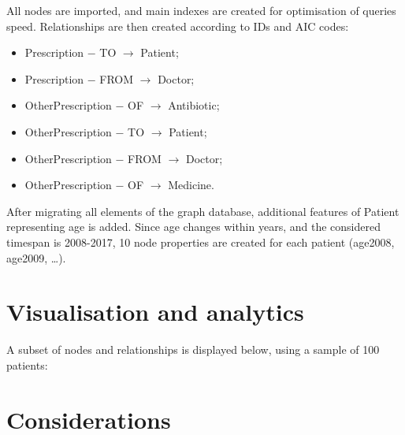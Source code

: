All nodes are imported, and main indexes are created for optimisation of queries speed. Relationships are then created according to IDs and AIC codes:
\begin{itemize}
	\item Prescription $-$ TO $\rightarrow$ Patient;
	\item Prescription $-$ FROM $\rightarrow$ Doctor;
	\item OtherPrescription $-$ OF $\rightarrow$ Antibiotic;
	\item OtherPrescription $-$ TO $\rightarrow$ Patient;
	\item OtherPrescription $-$ FROM $\rightarrow$ Doctor;
	\item OtherPrescription $-$ OF $\rightarrow$ Medicine.
\end{itemize}

After migrating all elements of the graph database, additional features of Patient representing age is added. Since age changes within years, and the considered timespan is 2008-2017, 10 node properties are created for each patient (age2008, age2009, \dots).

\section{Visualisation and analytics}
A subset of nodes and relationships is displayed below, using a sample of 100 patients:



\section{Considerations}







